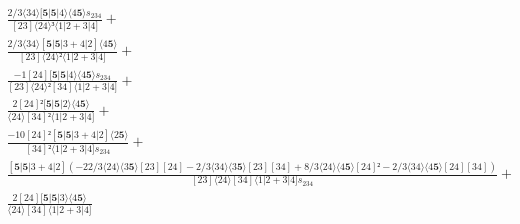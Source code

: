\documentclass[varwidth, border=5pt]{standalone}
\begin{document}
\begin{my}
$\begin{gathered}
\scriptscriptstyle\frac{2/3⟨34⟩[𝟓|𝟓|4⟩⟨4𝟓⟩s_{234}}{[23]⟨24⟩³⟨1|2+3|4]} +\\
\scriptscriptstyle\frac{2/3⟨34⟩[𝟓|𝟓|3+4|2]⟨4𝟓⟩}{[23]⟨24⟩²⟨1|2+3|4]} +\\
\scriptscriptstyle\frac{-1[24][𝟓|𝟓|4⟩⟨4𝟓⟩s_{234}}{[23]⟨24⟩²[34]⟨1|2+3|4]} +\\
\scriptscriptstyle\frac{2[24]²[𝟓|𝟓|2⟩⟨4𝟓⟩}{⟨24⟩[34]²⟨1|2+3|4]} +\\
\scriptscriptstyle\frac{-10[24]²[𝟓|𝟓|3+4|2]⟨2𝟓⟩}{[34]²⟨1|2+3|4]s_{234}} +\\
\scriptscriptstyle\frac{[𝟓|𝟓|3+4|2](-22/3⟨24⟩⟨3𝟓⟩[23][24]-2/3⟨34⟩⟨3𝟓⟩[23][34]+8/3⟨24⟩⟨4𝟓⟩[24]²-2/3⟨34⟩⟨4𝟓⟩[24][34])}{[23]⟨24⟩[34]⟨1|2+3|4]s_{234}} +\\
\scriptscriptstyle\frac{2[24][𝟓|𝟓|3⟩⟨4𝟓⟩}{⟨24⟩[34]⟨1|2+3|4]} \phantom{+}
\end{gathered}$
\end{my}
\end{document}

